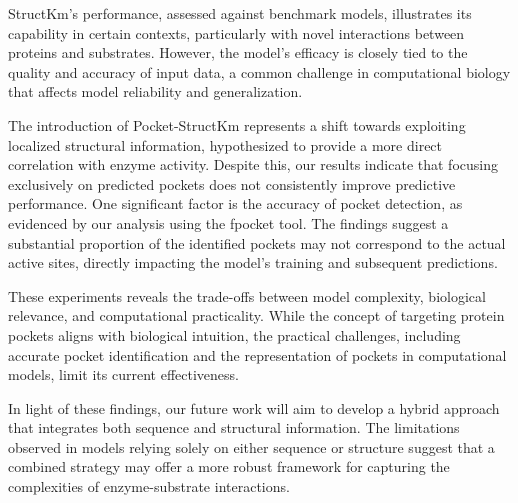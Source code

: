 StructKm's performance, assessed against benchmark models, illustrates its capability in certain contexts, particularly with novel interactions between proteins and substrates. However, the model's efficacy is closely tied to the quality and accuracy of input data, a common challenge in computational biology that affects model reliability and generalization.

The introduction of Pocket-StructKm represents a shift towards exploiting localized structural information, hypothesized to provide a more direct correlation with enzyme activity. Despite this, our results indicate that focusing exclusively on predicted pockets does not consistently improve predictive performance. One significant factor is the accuracy of pocket detection, as evidenced by our analysis using the fpocket tool. The findings suggest a substantial proportion of the identified pockets may not correspond to the actual active sites, directly impacting the model's training and subsequent predictions.

These experiments reveals the trade-offs between model complexity, biological relevance, and computational practicality. While the concept of targeting protein pockets aligns with biological intuition, the practical challenges, including accurate pocket identification and the representation of pockets in computational models, limit its current effectiveness.

In light of these findings, our future work will aim to develop a hybrid approach that integrates both sequence and structural information. The limitations observed in models relying solely on either sequence or structure suggest that a combined strategy may offer a more robust framework for capturing the complexities of enzyme-substrate interactions.